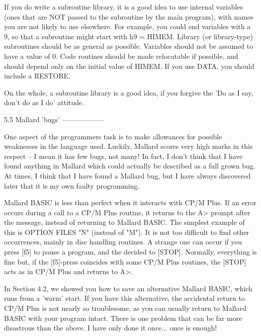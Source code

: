 If  you  do  write a subroutine library, it is a good  idea  to  use  internal 
variables  (ones that are NOT passed to the subroutine by the  main  program), 
with  names  you are not likely to use elsewhere. For example, you  could  end 
variables with a 9, so that a subroutine might start with h9 = HIMEM.  Library 
(or  library-type)  subroutines should be as general  as  possible.  Variables 
should  not  be  assumed to have a value of 0. Code routines  should  be  made 
relocatable if possible, and should depend only on the initial value of HIMEM. 
If you use DATA, you should include a RESTORE.

On the whole, a subroutine library is a good idea, if you forgive the 'Do as I 
say, don't do as I do' attitude.


5.5 Mallard 'bugs'
------------------

One  aspect  of  the  programmers task is  to  make  allowances  for  possible 
weaknesses  in the language used. Luckily, Mallard scores very high  marks  in 
this respect -- I mean it has few bugs, not many! In fact, I don't think  that 
I  have found anything in Mallard which could actually be described as a  full 
grown  bug.  At  times, I think that I have found a Mallard bug,  but  I  have 
always discovered later that it is my own faulty programming.

Mallard  BASIC  is less than perfect when it interacts with CP/M Plus.  If  an 
error occurs during a call to a CP/M Plus routine, it returns to the A> prompt 
after the message, instead of returning to Mallard BASIC. The simplest example 
of this is OPTION FILES "N" (instead of "M"). It is not too difficult to  find 
other  occurrences, mainly in disc handling routines. A strange one can  occur 
if  you  press [f5] to pause a program, and the decided to  [STOP].  Normally, 
everything  is  fine  but, if the [f5]-press coincides  with  some  CP/M  Plus 
routines, the [STOP] acts as in CP/M Plus and returns to A>.

In Section 4.2, we showed you how to save an alternative Mallard BASIC,  which 
runs from a 'warm' start. If you have this alternative, the accidental  return 
to  CP/M  Plus  is not nearly so troublesome, as you  can  usually  return  to 
Mallard  BASIC with your program intact. There is one problem that can be  far 
more disastrous than the above. I have only done it once... once is enough!

